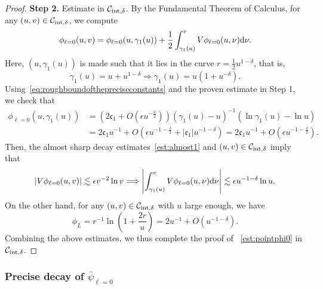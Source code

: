 \documentclass[a4paper,reqno]{amsart}
\theoremstyle{definition}
\numberwithin{equation}{section}
\def \d {{\rm{d}}}
\def\ep{\epsilon}
\begin{document}
\begin{proof}
\smallskip
\textbf{Step 2.} Estimate in $\mathcal{C}_{{\rm{int}},\delta}$.
By the Fundamental Theorem of Calculus, for any $(u,v)\in \mathcal{C}_{{\rm{int}},\delta}$, we compute
\begin{equation*}
\phi_{\ell=0}(u,v)=\phi_{\ell=0}(u,\gamma_{1}(u))+\frac{1}{2}\int_{\gamma_{1}(u)}^{v}V\phi_{\ell=0}(u,\nu)\d \nu.
\end{equation*}
Here, $(u,\gamma_{1}(u))$ is made such that it lies in the curve $r=\frac{1}{2}u^{1-\delta}$, that is,
\begin{equation*}
\gamma_{1}(u)=u+u^{1-\delta}\Longrightarrow \gamma_{1}(u)=u\left(1+u^{-\delta}\right).
\end{equation*}
Using~\eqref{eq:roughboundofthepreciseconstants} and the proven estimate in Step 1, we check that
\begin{equation*}
\begin{aligned}
\phi_{\ell=0}(u,\gamma_{1}(u))
&=\left(2{\mathfrak{c}}_{1}+O(\ep u^{-\frac{\delta}{2}})\right)
\left(\gamma_{1}(u)-u\right)^{-1}\left(\ln \gamma_{1}(u)-\ln u\right)\\
&=2{\mathfrak{c}}_{1}
u^{-1}+O(\ep u^{-1-\frac{\delta}{2}}+|\mathfrak{c}_1|u^{-1-\delta})
=2{\mathfrak{c}}_{1}
u^{-1}+O(\ep u^{-1-\frac{\delta}{2}}).
\end{aligned}
\end{equation*}
Then, the almost sharp decay estimates~\eqref{est:almost1} and $(u,v)\in \mathcal{C}_{\rm{int},\delta}$ imply that
\begin{equation*}
\left|V\phi_{\ell=0}(u,v)\right|
\lesssim \ep v^{-2}\ln v\Longrightarrow
\left|\int_{\gamma_{1}(u)}^{v}V\phi_{\ell=0}(u,\nu)\d \nu\right|
\lesssim \ep u^{-1-\delta}
\ln u.
\end{equation*}
On the other hand, for any $(u,v)\in \mathcal{C}_{{\rm{int}},\delta}$ with $u$ large enough, we have 
\begin{equation*}
\phi_{L}=r^{-1}\ln \left(1+\frac{2r}{u}\right)=2u^{-1}
+O(u^{-1-\delta}).
\end{equation*}
Combining the above estimates, we thus complete the proof of 
~\eqref{est:pointphi0} in 
$\mathcal{C}_{{\rm{int}},\delta}$.
\end{proof}


\subsubsection{Precise decay of $\bar{\psi}_{\ell=0}$}
\end{document}
